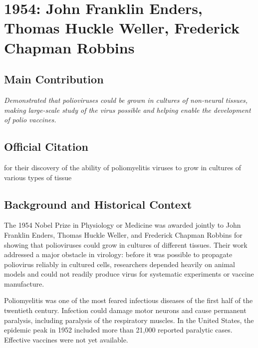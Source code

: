 \chapter[1954 --- Enders, Weller, and Robbins]{1954: John Franklin Enders, Thomas Huckle Weller, Frederick Chapman Robbins}
\label{ch:1954_enders_weller_robbins}

\section*{Main Contribution}

\textit{Demonstrated that polioviruses could be grown in cultures of non-neural tissues, making large-scale study of the virus possible and helping enable the development of polio vaccines.}\cite{nobel-1954,lecture-1954}

\section{Official Citation}

for their discovery of the ability of poliomyelitis viruses to grow in cultures of various types of tissue

\section{Background and Historical Context}

The 1954 Nobel Prize in Physiology or Medicine was awarded jointly to John Franklin Enders, Thomas Huckle Weller, and Frederick Chapman Robbins for showing that polioviruses could grow in cultures of different tissues. Their work addressed a major obstacle in virology: before it was possible to propagate poliovirus reliably in cultured cells, researchers depended heavily on animal models and could not readily produce virus for systematic experiments or vaccine manufacture.

Poliomyelitis was one of the most feared infectious diseases of the first half of the twentieth century. Infection could damage motor neurons and cause permanent paralysis, including paralysis of the respiratory muscles. In the United States, the epidemic peak in 1952 included more than 21,000 reported paralytic cases. Effective vaccines were not yet available.

